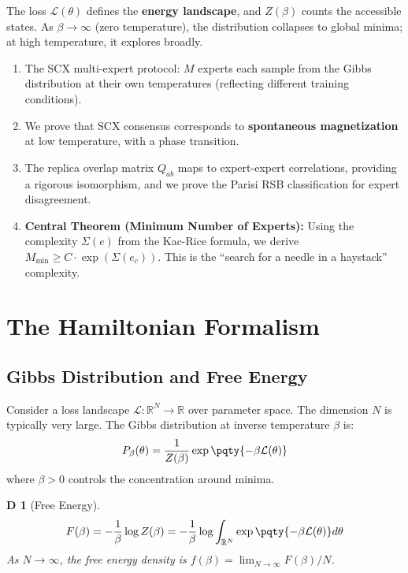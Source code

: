 \documentclass[12pt,a4paper]{article}
\newtheorem{definition}[theorem]Definition
\newcommand{\R}{\mathbb{R}}
\newcommand{\loss}{\mathcal{L}}
\begin{document}
The loss \(\loss(\theta)\) defines the \textbf{energy landscape}, and \(Z(\beta)\) counts the accessible states. As \(\beta \to \infty\) (zero temperature), the distribution collapses to global minima; at high temperature, it explores broadly.

\begin{enumerate}[label=(\arabic*)]
    \item The SCX multi-expert protocol: \(M\) experts each sample from the Gibbs distribution at their own temperatures (reflecting different training conditions).
    \item We prove that SCX consensus corresponds to \textbf{spontaneous magnetization} at low temperature, with a phase transition.
    \item The replica overlap matrix \(Q_{ab}\) maps to expert-expert correlations, providing a rigorous isomorphism, and we prove the Parisi RSB classification for expert disagreement.
    \item \textbf{Central Theorem (Minimum Number of Experts):} Using the complexity \(\Sigma(e)\) from the Kac-Rice formula, we derive \(M_{\min} \geq C \cdot \exp(\Sigma(e_c))\). This is the ``search for a needle in a haystack'' complexity.
\end{enumerate}
\section{The Hamiltonian Formalism}
\subsection{Gibbs Distribution and Free Energy}
Consider a loss landscape \(\loss: \R^N \to \R\) over parameter space. The dimension \(N\) is typically very large. The Gibbs distribution at inverse temperature \(\beta\) is:
\begin{equation}\label{eq:gibbs}
P_\beta(\theta) = \frac{1}{Z(\beta)} \exp\pqty{-\beta \loss(\theta)}
\end{equation}
where \(\beta > 0\) controls the concentration around minima.

\begin{definition}[Free Energy]
\begin{equation}\label{eq:free_energy}
F(\beta) = -\frac{1}{\beta} \log Z(\beta) = -\frac{1}{\beta} \log \int_{\R^N} \exp\pqty{-\beta \loss(\theta)} d\theta
\end{equation}
As \(N \to \infty\), the free energy density is \(f(\beta) = \lim_{N\to\infty} F(\beta)/N\).
\end{definition}
\end{document}
